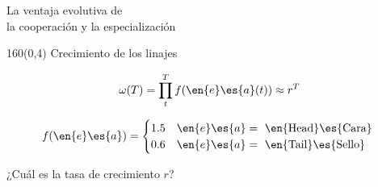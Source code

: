 \documentclass[shownotes,aspectratio=169]{beamer}
\newcommand{\Aa}{\en{e}\es{a}}
\begin{document}
\begin{frame}[plain]

\centering \LARGE

\textcolor{black!85}{La ventaja evolutiva de \\ la cooperación y la especialización}
\end{frame} 

\begin{frame}[plain]
\begin{textblock}{160}(0,4)
 \centering \LARGE
Crecimiento de los linajes
\end{textblock}
\vspace{1cm}

\begin{equation*} 
\omega(T) = \prod_t^T f(\Aa(t)) \approx r^T 
\end{equation*}

\vspace{0.3cm}

\begin{equation*}
f(\Aa) =
\begin{cases}
 1.5 & \Aa = \text{ \en{Head}\es{Cara} } \\
 0.6 & \Aa = \text{ \en{Tail}\es{Sello} }
\end{cases}
\end{equation*}

\pause \centering \vspace{1cm} 

¿Cuál es la tasa de crecimiento $r$?

\end{frame}
\end{document}
